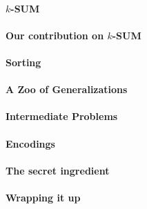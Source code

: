 \paragraph{\(k\)-SUM}


\paragraph{Our contribution on \(k\)-SUM}


\paragraph{Sorting}


\paragraph{A Zoo of Generalizations}





\paragraph{Intermediate Problems}


\paragraph{Encodings}


\paragraph{The secret ingredient}


\paragraph{Wrapping it up}

